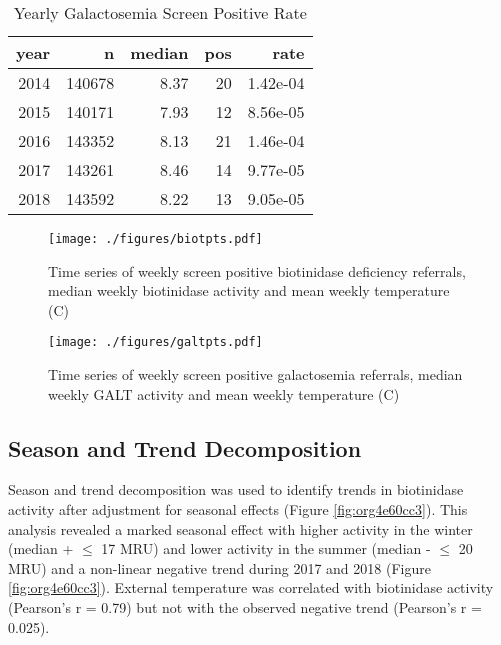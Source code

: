 \documentclass[review]{elsarticle}
\begin{document}
\begin{table}[ht]
\centering
\begin{tabular}{rrrrr}
  \hline
year & n & median & pos & rate \\ 
  \hline
2014 & 140678 & 8.37 &  20 & 1.42e-04 \\ 
  2015 & 140171 & 7.93 &  12 & 8.56e-05 \\ 
  2016 & 143352 & 8.13 &  21 & 1.46e-04 \\ 
  2017 & 143261 & 8.46 &  14 & 9.77e-05 \\ 
  2018 & 143592 & 8.22 &  13 & 9.05e-05 \\ 
   \hline
\end{tabular}
\caption{Yearly Galactosemia Screen Positive Rate} 
\label{tab:galt_year}
\end{table}

\begin{figure}[htbp]
\centering
\texttt{[image: ./figures/biotpts.pdf]}
\caption{\label{fig:org9cb0db1}Time series of weekly screen positive biotinidase deficiency referrals, median weekly biotinidase activity and mean weekly temperature (\degree{}C)}
\end{figure}

\begin{figure}[htbp]
\centering
\texttt{[image: ./figures/galtpts.pdf]}
\caption{\label{fig:org70aa7fe}Time series of weekly screen positive galactosemia referrals, median weekly GALT activity and mean weekly temperature (\degree{}C)}
\end{figure}

\clearpage

\subsection*{Season and Trend Decomposition}
\label{sec:org65539c6}
Season and trend decomposition was used to identify trends in
biotinidase activity after adjustment for seasonal effects (Figure
\ref{fig:org4e60cc3}). This analysis revealed a marked seasonal effect with
higher activity in the winter (median + \(\le\) 17 MRU) and lower activity
in the summer (median - \(\le\) 20 MRU) and a non-linear negative trend
during 2017 and 2018 (Figure \ref{fig:org4e60cc3}). External temperature was
correlated with biotinidase activity (Pearson's r = 0.79) but not with
the observed negative trend (Pearson's r = 0.025).
\end{document}
